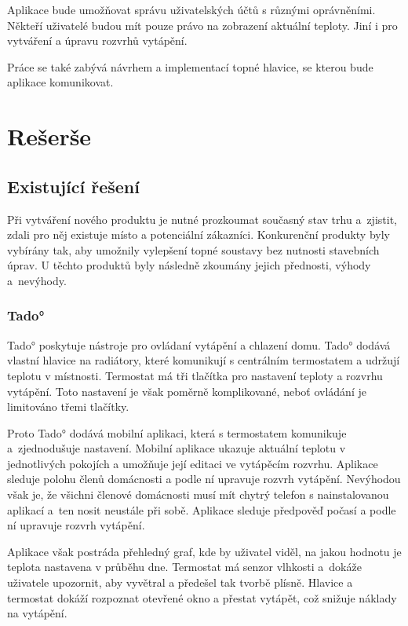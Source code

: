 \documentclass[thesis=B,czech]{FITthesis}[2012/10/20]
\begin{document}
Aplikace bude umožňovat správu uživatelských účtů s různými oprávněními. Někteří uživatelé budou mít pouze právo na zobrazení aktuální teploty. Jiní i pro vytváření a úpravu rozvrhů vytápění.

Práce se také zabývá návrhem a implementací topné hlavice, se kterou bude aplikace komunikovat.

\chapter{Rešerše}

\section{Existující řešení}

Při vytváření nového produktu je nutné prozkoumat současný stav trhu a~zjistit, zdali pro něj existuje místo a potenciální zákazníci. Konkurenční produkty byly vybírány tak, aby umožnily vylepšení topné soustavy bez nutnosti stavebních úprav. U těchto produktů byly následně zkoumány jejich přednosti, výhody a~nevýhody.

\subsection{Tado° }
Tado° poskytuje nástroje pro ovládaní vytápění a chlazení domu. Tado° dodává vlastní hlavice na radiátory, které komunikují s centrálním termostatem a udržují teplotu v místnosti. Termostat má tři tlačítka pro nastavení teploty a rozvrhu vytápění. Toto nastavení je však poměrně komplikované, neboť ovládání je limitováno třemi tlačítky.

Proto Tado° dodává mobilní aplikaci, která s termostatem komunikuje a~zjednodušuje nastavení. Mobilní aplikace ukazuje aktuální teplotu v jednotlivých pokojích a umožňuje její editaci ve vytápěcím rozvrhu. Aplikace sleduje polohu členů domácnosti a podle ní upravuje rozvrh vytápění. Nevýhodou však je, že všichni členové domácnosti musí mít chytrý telefon s nainstalovanou aplikací a~ten nosit neustále při sobě. Aplikace sleduje předpověď počasí a podle ní upravuje rozvrh vytápění. 

Aplikace však postráda přehledný graf, kde by uživatel viděl, na jakou hodnotu je teplota nastavena v průběhu dne.
Termostat má senzor vlhkosti a~dokáže uživatele upozornit, aby vyvětral a předešel tak tvorbě plísně. Hlavice a termostat dokáží rozpoznat otevřené okno a přestat vytápět, což snižuje náklady na vytápění.
\end{document}
